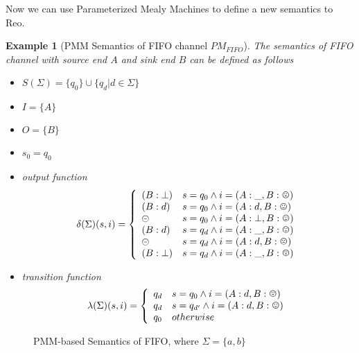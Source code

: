 \documentclass[conference, a4paper]{IEEEtran}
\newtheorem{example}{Example}
\newcommand{\rblock}[0]{\circleddash}
\newcommand{\rread}[0]{\smiley}
\newcommand{\rnoread}[0]{\frownie}
\begin{document}
Now we can use Parameterized Mealy Machines to define a new semantics to Reo.
\begin{example}[PMM Semantics of FIFO channel $PM_{FIFO}$]
  The semantics of FIFO channel with source end $A$ and sink end $B$ can be defined as follows
  \begin{itemize}
    \item[-] $S(\Sigma)=\{q_0\}\cup\{q_d|d\in\Sigma\}$
    \item[-] $I=\{A\}$
    \item[-] $O=\{B\}$
    \item[-] $s_0=q_0$
    \item[-] output function
      \begin{displaymath}
        \delta(\Sigma)(s,i)=\left\{
        \begin{array}[h]{ll}
          (B:\bot) & s=q_0\land i=(A:\_,B:\rnoread) \\
          (B:d) & s=q_0\land i=(A:d,B:\rread)\\
          \rblock & s=q_0\land i=(A:\bot,B:\rread) \\
          (B:d) & s=q_d\land i=(A:\_,B:\rread)\\
          \rblock & s=q_d\land i=(A:d,B:\rnoread) \\
          (B:\bot) & s=q_d\land i=(A:\_,B:\rnoread) \\     
        \end{array}
        \right.
      \end{displaymath}
    \item[-] transition function
      \begin{displaymath}
        \lambda(\Sigma)(s,i)=\left\{
        \begin{array}[h]{ll}
          q_d & s=q_0\land i=(A:d,B:\rnoread) \\
          q_d & s=q_{d'}\land i=(A:d,B:\rread) \\
          q_0 & otherwise \\
        \end{array}
        \right.
      \end{displaymath}
  \end{itemize}
\end{example}

\begin{figure}[h]
  \begin{center}
    
  \end{center}
  \caption{PMM-based Semantics of FIFO, where $\Sigma=\{a,b\}$}
  \label{fig:pmmfifo}
\end{figure}
\end{document}
